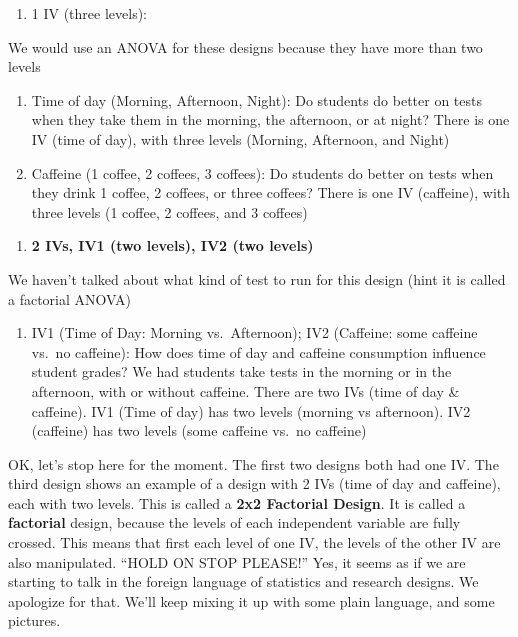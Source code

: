 \documentclass[
]{book}
\providecommand{\tightlist}{%
  \setlength{\itemsep}{0pt}\setlength{\parskip}{0pt}}
\begin{document}
\begin{enumerate}
\def\labelenumi{\arabic{enumi}.}
\setcounter{enumi}{1}
\tightlist
\item
  1 IV (three levels):
\end{enumerate}

We would use an ANOVA for these designs because they have more than two levels

\begin{enumerate}
\def\labelenumi{\alph{enumi}.}
\item
  Time of day (Morning, Afternoon, Night): Do students do better on tests when they take them in the morning, the afternoon, or at night? There is one IV (time of day), with three levels (Morning, Afternoon, and Night)
\item
  Caffeine (1 coffee, 2 coffees, 3 coffees): Do students do better on tests when they drink 1 coffee, 2 coffees, or three coffees? There is one IV (caffeine), with three levels (1 coffee, 2 coffees, and 3 coffees)
\end{enumerate}

\begin{enumerate}
\def\labelenumi{\arabic{enumi}.}
\setcounter{enumi}{2}
\tightlist
\item
  \textbf{2 IVs, IV1 (two levels), IV2 (two levels)}
\end{enumerate}

We haven't talked about what kind of test to run for this design (hint it is called a factorial ANOVA)

\begin{enumerate}
\def\labelenumi{\alph{enumi}.}
\tightlist
\item
  IV1 (Time of Day: Morning vs.~Afternoon); IV2 (Caffeine: some caffeine vs.~no caffeine): How does time of day and caffeine consumption influence student grades? We had students take tests in the morning or in the afternoon, with or without caffeine. There are two IVs (time of day \& caffeine). IV1 (Time of day) has two levels (morning vs afternoon). IV2 (caffeine) has two levels (some caffeine vs.~no caffeine)
\end{enumerate}

OK, let's stop here for the moment. The first two designs both had one IV. The third design shows an example of a design with 2 IVs (time of day and caffeine), each with two levels. This is called a \textbf{2x2 Factorial Design}. It is called a \textbf{factorial} design, because the levels of each independent variable are fully crossed. This means that first each level of one IV, the levels of the other IV are also manipulated. ``HOLD ON STOP PLEASE!'' Yes, it seems as if we are starting to talk in the foreign language of statistics and research designs. We apologize for that. We'll keep mixing it up with some plain language, and some pictures.
\end{document}
